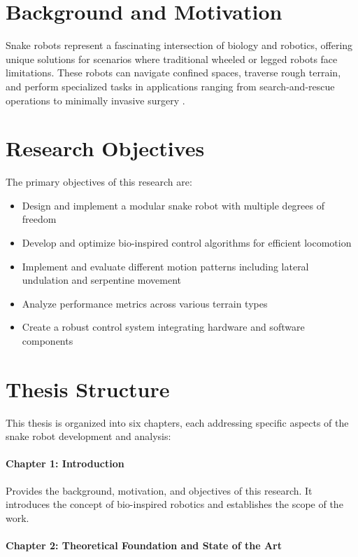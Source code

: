 \documentclass[12pt,a4paper]{report}
\begin{document}
\section{Background and Motivation}
Snake robots represent a fascinating intersection of biology and robotics, offering unique solutions for scenarios where traditional wheeled or legged robots face limitations. These robots can navigate confined spaces, traverse rough terrain, and perform specialized tasks in applications ranging from search-and-rescue operations to minimally invasive surgery \cite{transeth-2009}.

\section{Research Objectives}
The primary objectives of this research are:
\begin{itemize}
    \item Design and implement a modular snake robot with multiple degrees of freedom
    \item Develop and optimize bio-inspired control algorithms for efficient locomotion
    \item Implement and evaluate different motion patterns including lateral undulation and serpentine movement
    \item Analyze performance metrics across various terrain types
    \item Create a robust control system integrating hardware and software components
\end{itemize}


\section{Thesis Structure}
This thesis is organized into six chapters, each addressing specific aspects of the snake robot development and analysis:

\paragraph{Chapter 1: Introduction} 
Provides the background, motivation, and objectives of this research. It introduces the concept of bio-inspired robotics and establishes the scope of the work.

\paragraph{Chapter 2: Theoretical Foundation and State of the Art} 
\end{document}
